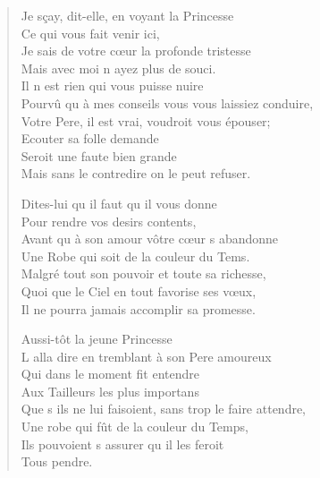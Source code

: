 \documentclass[14pt,a4paper]{memoir}
\begin{document}
{{\begin{otherlanguage}{french}
\begin{verse}
\vin Je sçay, dit-elle, en voyant la Princesse \\
\vin\vin Ce qui vous fait venir ici, \\
Je sais de votre cœur la profonde tristesse \\
\vin Mais avec moi n\textquotesingle{} ayez plus de souci. \\
\vin Il n\textquotesingle{} est rien qui vous puisse nuire \\
Pourvû qu\textquotesingle{} à mes conseils vous vous laissiez conduire, \\
Votre Pere, il est vrai, voudroit vous épouser; \\
\vin Ecouter sa folle demande \\
\vin Seroit une faute bien grande \\
Mais sans le contredire on le peut refuser.

\vin Dites-lui qu\textquotesingle{} il faut qu\textquotesingle{} il vous donne \\
\vin Pour rendre vos desirs contents, \\
Avant qu\textquotesingle{} à son amour vôtre cœur s\textquotesingle{} abandonne \\
Une Robe qui soit de la couleur du Tems. \\
Malgré tout son pouvoir et toute sa richesse, \\
Quoi que le Ciel en tout favorise ses vœux, \\
Il ne pourra jamais accomplir sa promesse.

\vin Aussi-tôt la jeune Princesse \\
L\textquotesingle{} alla dire en tremblant à son Pere amoureux \\
\vin Qui dans le moment fit entendre \\
\vin Aux Tailleurs les plus importans \\
Que s\textquotesingle{} ils ne lui faisoient, sans trop le faire attendre, \\
Une robe qui fût de la couleur du Temps, \\
Ils pouvoient s\textquotesingle{} assurer qu\textquotesingle{} il les feroit \\
\vin\vin Tous pendre.


\end{verse}
\end{otherlanguage}}}
\end{document}
